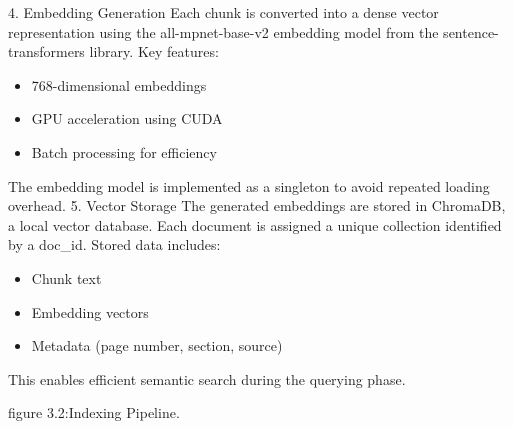 \documentclass[12pt,a4paper]{report}
\begin{document}
4. Embedding Generation
Each chunk is converted into a dense vector representation using the all-mpnet-base-v2 embedding model from the sentence-transformers library. Key features:
\begin{itemize}
\item 768-dimensional embeddings
\item GPU acceleration using CUDA
\item Batch processing for efficiency
\end{itemize}
The embedding model is implemented as a singleton to avoid repeated loading overhead.
5. Vector Storage
The generated embeddings are stored in ChromaDB, a local vector database. Each document is assigned a unique collection identified by a doc\_id. Stored data includes:
\begin{itemize}
\item Chunk text
\item Embedding vectors
\item Metadata (page number, section, source)
\end{itemize}
This enables efficient semantic search during the querying phase.


figure 3.2:Indexing Pipeline.
\end{document}
